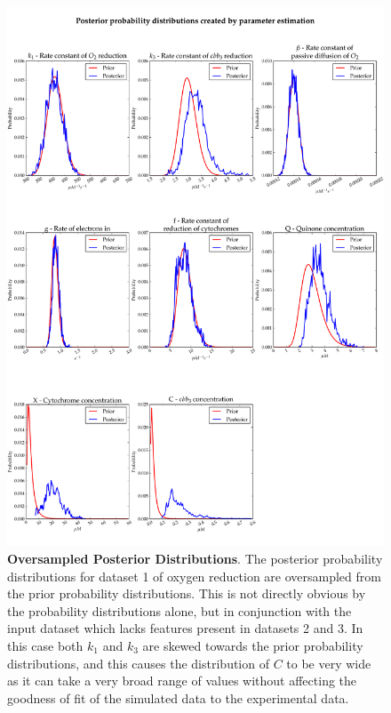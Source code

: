 \begin{figure}[p]
 \centering
 \includegraphics[width=15cm, trim=0cm 1.2cm 0cm 0.1cm, clip=true]{./05-oxygenreduction/data/oversampling_posteriors.pdf}
 \caption[Oversampled Posterior Distributions]{{\bf Oversampled Posterior Distributions}. The posterior probability distributions for dataset 1 of oxygen reduction are oversampled from the prior probability distributions. This is not directly obvious by the probability distributions alone, but in conjunction with the input dataset which lacks features present in datasets 2 and 3. In this case both $k_1$ and $k_3$ are skewed towards the prior probability distributions, and this causes the distribution of $C$ to be very wide as it can take a very broad range of values without affecting the goodness of fit of the simulated data to the experimental data.
 \label{fig:dataset1posterior}}
\end{figure}

